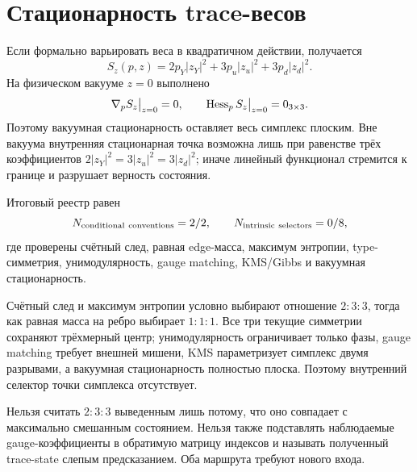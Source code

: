 \section{Стационарность trace-весов}

Если формально варьировать веса в квадратичном действии, получается
\begin{equation}
 S_z(p,z)=2p_Y|z_Y|^2+3p_u|z_u|^2+3p_d|z_d|^2.
 \label{eq:v8-extra-edge-simplex-weight-action}
\end{equation}
На физическом вакууме $z=0$ выполнено
\begin{equation}
 \nabla_pS_z\big|_{z=0}=0,\qquad
 \operatorname{Hess}_pS_z\big|_{z=0}=0_{3\times3}.
 \label{eq:v8-extra-edge-simplex-vacuum-flatness}
\end{equation}
Поэтому вакуумная стационарность оставляет весь симплекс плоским. Вне
вакуума внутренняя стационарная точка возможна лишь при равенстве трёх
коэффициентов $2|z_Y|^2=3|z_u|^2=3|z_d|^2$; иначе линейный функционал
стремится к границе и разрушает верность состояния.

Итоговый реестр равен
\begin{equation}
 N_{\rm conditional\ conventions}=2/2,\qquad
 N_{\rm intrinsic\ selectors}=0/8,
 \label{eq:v8-extra-edge-simplex-ledgers}
\end{equation}
где проверены счётный след, равная edge-масса, максимум энтропии,
type-симметрия, унимодулярность, gauge matching, KMS/Gibbs и вакуумная
стационарность.

\begin{theorem}
Счётный след и максимум энтропии условно выбирают отношение $2:3:3$, тогда
как равная масса на ребро выбирает $1:1:1$. Все три текущие симметрии
сохраняют трёхмерный центр; унимодулярность ограничивает только фазы,
gauge matching требует внешней мишени, KMS параметризует симплекс двумя
разрывами, а вакуумная стационарность полностью плоска. Поэтому внутренний
селектор точки симплекса отсутствует.
\end{theorem}

\begin{nogocriterion}
Нельзя считать $2:3:3$ выведенным лишь потому, что оно совпадает с
максимально смешанным состоянием. Нельзя также подставлять наблюдаемые
gauge-коэффициенты в обратимую матрицу индексов и называть полученный
trace-state слепым предсказанием. Оба маршрута требуют нового входа.
\end{nogocriterion}

